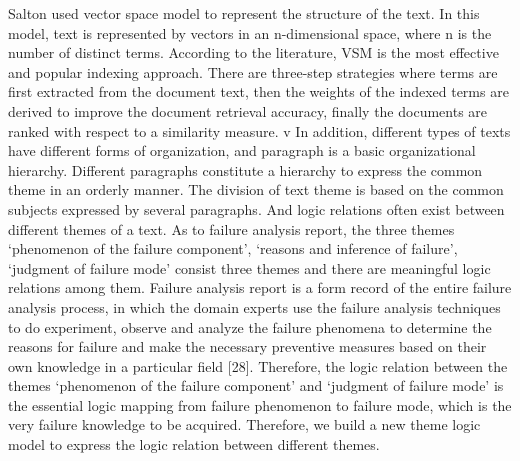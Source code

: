 \documentclass{elsarticle}
\begin{document}
Salton used vector space model to represent the structure of the
text. In this model, text is represented by vectors in an
n-dimensional space, where n is the number of distinct
terms. According to the literature, VSM is the most effective and
popular indexing approach. There are three-step strategies where terms
are first extracted from the document text, then the weights of the
indexed terms are derived to improve the document retrieval accuracy,
finally the documents are ranked with respect to a similarity measure.
v
In addition, different types of texts have different forms of organization, and paragraph is a basic organizational hierarchy. Different paragraphs constitute a hierarchy to express the common theme in an orderly manner. The division of text theme is based on the common subjects expressed by several paragraphs. And logic relations often exist between different themes of a text. As to failure analysis report, the three themes ‘phenomenon of the failure component’, ‘reasons and inference of failure’, ‘judgment of failure mode’ consist three themes and there are meaningful logic relations among them. Failure analysis report is a form record of the entire failure analysis process, in which the domain experts use the failure analysis techniques to do experiment, observe and analyze the failure phenomena to determine the reasons for failure and make the necessary preventive measures based on their own knowledge in a particular field [28]. Therefore, the logic relation between the themes ‘phenomenon of the failure component’ and ‘judgment of failure mode’ is the essential logic mapping from failure phenomenon to failure mode, which is the very failure knowledge to be acquired. Therefore, we build a new theme logic model to express the logic relation between different themes.






\end{document}
